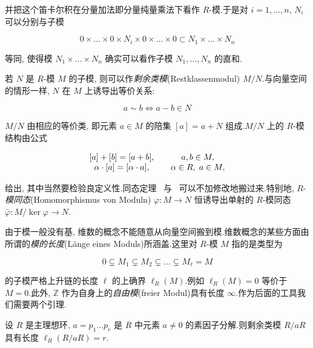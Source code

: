 并把这个笛卡尔积在分量加法即分量纯量乘法下看作 $R$-模.于是对 $i = 1, \ldots, n$, $N_i$ 可以分别与子模

\[
0 \times \ldots \times 0 \times N_i \times 0 \times \ldots \times 0 \subset N_1 \times \ldots \times N_n\]

等同, 使得模 $N_1 \times \ldots \times N_n$ 确实可以看作子模 $N_1, \ldots, N_n$ 的直和.

若 $N$ 是 $R$-模 $M$ 的子模, 则可以作\emph{剩余类模}(\textup{Restklassenmodul}) $M/N$.与向量空间的情形一样, $N$ 在 $M$ 上诱导出等价关系:

\[
a \sim b \Longleftrightarrow a - b \in N\]

$M/N$ 由相应的等价类, 即元素 $a \in M$ 的陪集 $[a] = a + N$ 组成.$M/N$ 上的 $R$-模结构由公式

\[
\begin{array}{c c}
[a] + [b] = [a + b], & \quad a, b \in M, \\
\alpha \cdot [a] = [\alpha \cdot a], & \quad \alpha \in R, \; a \in M,
\end{array}\]

给出, 其中当然要检验良定义性.同态定理~ 与~ 可以不加修改地搬过来.特别地, $R$-\emph{模同态}(\textup{Homomorphismus von Moduln}) $\varphi \colon M \longrightarrow N$ 恒诱导出单射的 $R$-模同态 $\bar{\varphi} \colon M/\ker \varphi \longrightarrow N$.

由于模一般没有基, 维数的概念不能随意从向量空间搬到模.维数概念的某些方面由所谓的\emph{模的长度}(\textup{Länge eines Moduls})所涵盖.这里对 $R$-模 $M$ 指的是类型为

\[
0 \subsetneq M_1 \subsetneq M_2 \subsetneq \ldots \subsetneq M_\ell = M\]

的子模严格上升链的长度 $\ell$ 的上确界 $\ell_R(M)$.例如 $\ell_R(M) = 0$ 等价于 $M = 0$.此外, $\mathbb{Z}$ 作为自身上的\emph{自由模}(\textup{freier Modul})具有长度 $\infty$.作为后面的工具我们需要两个引理.

\begin{lemma}\label{lem:6.3.2}
设 $R$ 是主理想环, $a = p_1 \ldots p_r$ 是 $R$ 中元素 $a \neq 0$ 的素因子分解.则剩余类模 $R/aR$ 具有长度 $\ell_R(R/aR) = r$.
\end{lemma}


